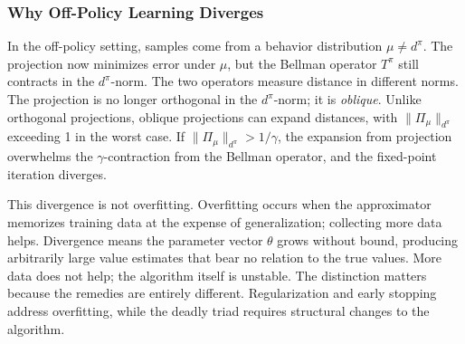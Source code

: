 \subsubsection{Why Off-Policy Learning Diverges}

In the off-policy setting, samples come from a behavior distribution $\mu \neq d^\pi$. The projection now minimizes error under $\mu$, but the Bellman operator $T^\pi$ still contracts in the $d^\pi$-norm. The two operators measure distance in different norms. The projection is no longer orthogonal in the $d^\pi$-norm; it is \emph{oblique}. Unlike orthogonal projections, oblique projections can expand distances, with $\|\Pi_\mu\|_{d^\pi}$ exceeding 1 in the worst case. If $\|\Pi_\mu\|_{d^\pi} > 1/\gamma$, the expansion from projection overwhelms the $\gamma$-contraction from the Bellman operator, and the fixed-point iteration diverges.

This divergence is not overfitting. Overfitting occurs when the approximator memorizes training data at the expense of generalization; collecting more data helps. Divergence means the parameter vector $\theta$ grows without bound, producing arbitrarily large value estimates that bear no relation to the true values. More data does not help; the algorithm itself is unstable. The distinction matters because the remedies are entirely different. Regularization and early stopping address overfitting, while the deadly triad requires structural changes to the algorithm.

